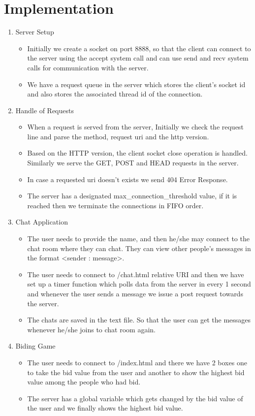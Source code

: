 \documentclass[a4paper]{article}
\begin{document}
\section{Implementation}
   \begin{enumerate}
       \item Server Setup
       \begin{itemize}
           \item Initially we create a socket on  port 8888, so that the client can connect to the server using the accept system call and can use send and recv system calls for communication with the server.
           \item We have a request queue in the server which stores the client's socket id and also stores the associated thread id of the connection.
       \end{itemize}
       \item Handle of Requests
       \begin{itemize}
           \item When a request is served from the server, Initially we check the request line and parse the method, request uri and the http version.
           \item Based on the HTTP version, the client socket close operation is handled. Similarly we serve the GET, POST and HEAD requests in the server.
           \item In case a requested uri doesn't exists we send 404 Error Response.
           \item The server has a designated max\_connection\_threshold value, if it is reached then we terminate the connections in FIFO order.
       \end{itemize}
       \item Chat Application
       \begin{itemize}
          \item The user needs to provide the name, and then he/she may connect to the chat room where they can chat. They can view other people's messages in the format <sender : message>.
          \item The user needs to connect to /chat.html relative URI and then we have set up a timer function which polls data from the server in every 1 second and whenever the user sends a message we issue a post request towards the server.
          \item The chats are saved in the text file. So that the user can get the messages whenever he/she joins to chat room again.
       \end{itemize}
       \item Biding Game
       \begin{itemize}
          \item The user needs to connect to /index.html and there we have 2 boxes one to take the bid value from the user and another to show the highest bid value among the people who had bid. 
          \item The server has a global variable which gets changed by the bid value of the user and we finally shows the highest bid value.
       \end{itemize}
   \end{enumerate}
\end{document}
